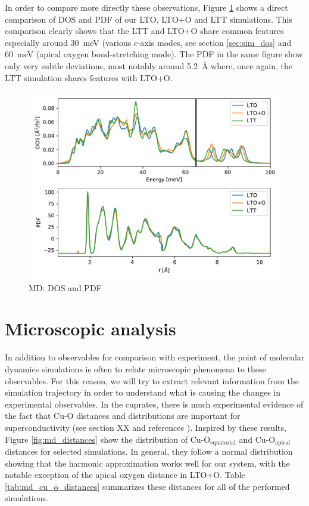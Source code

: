 In order to compare more directly these observations, Figure \ref{fig:dos_pdf} shows a direct comparison of DOS and PDF of our LTO, LTO+O and LTT simulations. This comparison clearly shows that the LTT and LTO+O share common features especially around \SI{30}{\milli\eV} (various $c$-axis modes, see section \ref{sec:sim_dos} and \SI{60}{\milli\eV} (apical oxygen bond-stretching mode). The PDF in the same figure show only very subtle deviations, most notably around \SI{5.2}{\angstrom} where, once again, the LTT simulation shares features with LTO+O.

\begin{figure}
	\centering
	\includegraphics[width=\textwidth]{fig/md/lto_ltt_ltoo_comparison.pdf}
	\caption[MD: DOS and PDF]{MD: DOS and PDF}
	\label{fig:dos_pdf}
\end{figure}

\section{Microscopic analysis}
In addition to observables for comparison with experiment, the point of molecular dynamics simulations is often to relate microscopic phenomena to these observables. For this reason, we will try to extract relevant information from the simulation trajectory in order to understand what is causing the changes in experimental observables. In the cuprates, there is much experimental evidence of the fact that Cu-O distances and distributions are important for superconductivity (see section XX and references \cite{Bozin2000, Peng2017, Ivashko2019}). Inspired by these results, Figure \ref{fig:md_distances} show the distribution of Cu-O$_\text{equatorial}$ and Cu-O$_\text{apical}$ distances for selected simulations. In general, they follow a normal distribution showing that the harmonic approximation works well for our system, with the notable exception of the apical oxygen distance in LTO+O. Table \ref{tab:md_cu_o_distances} summarizes these distances for all of the performed simulations.  

